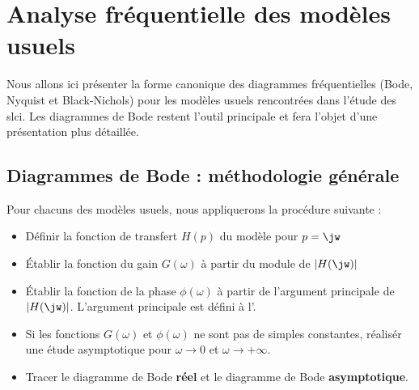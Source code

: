 \section{Analyse fréquentielle des modèles usuels}
Nous allons ici présenter la forme canonique des diagrammes fréquentielles 
(Bode, Nyquist et Black-Nichols) pour les modèles usuels rencontrées dans 
l'étude des \gls{slci}. Les diagrammes de Bode restent l'outil principale et 
fera l'objet d'une présentation plus détaillée.
\subsection{Diagrammes de Bode : méthodologie générale}
Pour chacuns des modèles usuels, nous appliquerons la procédure suivante :
\begin{itemize}
    \item Définir la fonction de transfert $H(p)$ du modèle pour $p=\jw$
    \item \'Etablir la fonction du gain $G(\omega)$ à partir du 
          module de $|H(\jw)|$
    \item \'Etablir la fonction de la phase $\phi(\omega)$ à partir de 
          l'argument principale de $|H(\jw)|$.
          L'argument principale est défini à l'.
    \item Si les fonctions $G(\omega)$ et $\phi(\omega)$ ne sont pas de 
          simples constantes, réalisér une étude
          asymptotique pour $\omega\rightarrow 0$ et 
          $\omega\rightarrow +\infty$.
    \item Tracer le diagramme de Bode \textbf{réel} et le diagramme 
          de Bode \textbf{asymptotique}.
\end{itemize}
\newpage
